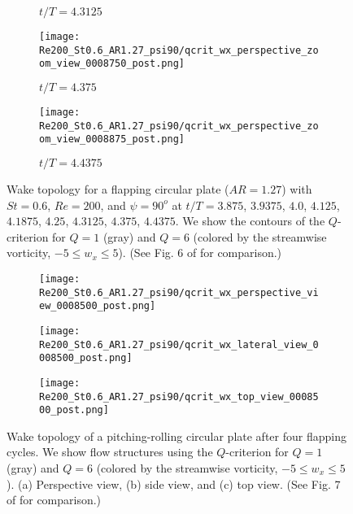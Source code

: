 \begin{figure}[H]
\begin{subfigure}[b]{0.3\textwidth}
    \caption{$t / T = 4.3125$}
    \label{fig:baseline_qcrit_perspective:0008625}
  \end{subfigure}
  \hspace{0.5em}
  \begin{subfigure}[b]{0.3\textwidth}
    \centering
    \texttt{[image: Re200\_St0.6\_AR1.27\_psi90/qcrit\_wx\_perspective\_zoom\_view\_0008750\_post.png]}
    \caption{$t / T = 4.375$}
    \label{fig:baseline_qcrit_perspective:0008750}
  \end{subfigure}
  \hspace{0.5em}
  \begin{subfigure}[b]{0.3\textwidth}
    \centering
    \texttt{[image: Re200\_St0.6\_AR1.27\_psi90/qcrit\_wx\_perspective\_zoom\_view\_0008875\_post.png]}
    \caption{$t / T = 4.4375$}
    \label{fig:baseline_qcrit_perspective:0008875}
  \end{subfigure}
  \caption{Wake topology for a flapping circular plate ($AR = 1.27$) with $St = 0.6$, $Re = 200$, and $\psi = 90^o$ at $t / T = 3.875$, $3.9375$, $4.0$, $4.125$, $4.1875$, $4.25$, $4.3125$, $4.375$, $4.4375$. We show the contours of the $Q$-criterion for $Q = 1$ (gray) and $Q = 6$ (colored by the streamwise vorticity, $-5 \leq w_x \leq 5$). (See Fig. 6 of \citet{li_dong_2016} for comparison.)}
  \label{fig:baseline_qcrit_perspective}
\end{figure}

\begin{figure}[H]
  \centering
  \begin{minipage}{0.55\linewidth}
    \begin{subfigure}[t]{\linewidth}
      \texttt{[image: Re200\_St0.6\_AR1.27\_psi90/qcrit\_wx\_perspective\_view\_0008500\_post.png]}
      \caption{}
      \label{fig:baseline_wake_topology:perspective}
    \end{subfigure}
  \end{minipage}
  \begin{minipage}{0.35\linewidth}
    \begin{subfigure}[t]{\linewidth}
      \texttt{[image: Re200\_St0.6\_AR1.27\_psi90/qcrit\_wx\_lateral\_view\_0008500\_post.png]}
      \caption{}
      \label{fig:baseline_wake_topology:lateral}
    \end{subfigure}
    \vspace{1cm}
    \begin{subfigure}[b]{\linewidth}
      \texttt{[image: Re200\_St0.6\_AR1.27\_psi90/qcrit\_wx\_top\_view\_0008500\_post.png]}
      \caption{}
      \label{fig:baseline_wake_topology:top}
    \end{subfigure}
  \end{minipage}
  \caption{Wake topology of a pitching-rolling circular plate after four flapping cycles. We show flow structures  using the $Q$-criterion for $Q = 1$ (gray) and $Q = 6$ (colored by the streamwise vorticity, $-5 \leq w_x \leq 5$). (a) Perspective view, (b) side view, and (c) top view. (See Fig. 7 of \citet{li_dong_2016} for comparison.)}
  \label{fig:baseline_wake_topology}
\end{figure}

